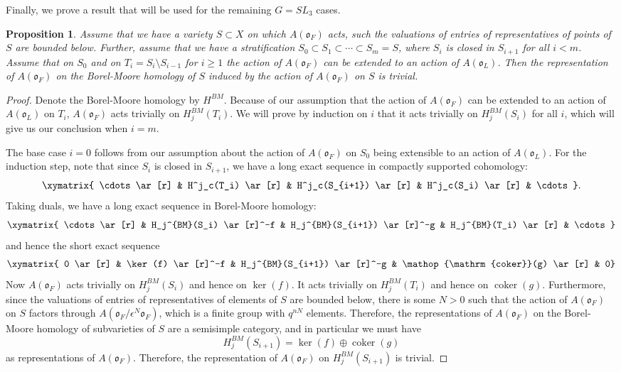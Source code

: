 \documentclass{amsart}
\newtheorem{prop}{Proposition}[subsection]
\theoremstyle{definition}
\def\O{\mathfrak{o}}
\def\e{\epsilon}
\def\coker{\mathop{\mathrm{coker}}}
\def\A{A(\O_F)}
\begin{document}
  Finally, we prove a result that will be used for the remaining $G = SL_3$
  cases.
  \begin{prop}
    \label{prop:Triviality-For-Stratified-Set}
    Assume that we have a variety $S \subset X$ on which $\A$ acts, such the
    valuations of entries of representatives of points of $S$ are bounded
    below.  Further, assume that we have a stratification $S_0 \subset S_1
    \subset \cdots \subset S_m = S$, where $S_i$ is closed in $S_{i + 1}$ for
    all $i < m$.  Assume that on $S_0$ and on $T_i = S_i \setminus S_{i - 1}$
    for $i \ge 1$ the action of $\A$ can be extended to an action of $A(\O_L)$.
    Then the representation of $\A$ on the Borel-Moore homology of $S$ induced
    by the action of $\A$ on $S$ is trivial.
  \end{prop}
  \begin{proof}
    Denote the Borel-Moore homology by $H^{BM}$.  Because of our assumption
    that the action of $\A$ can be extended to an action of $A(\O_L)$ on $T_i$,
    $\A$ acts trivially on $H_j^{BM}(T_i)$.  We will prove by induction on $i$
    that it acts trivially on $H_j^{BM}(S_i)$ for all $i$, which will give us
    our conclusion when $i = m$.

    The base case $i = 0$ follows from our assumption about the action of $\A$
    on $S_0$ being extensible to an action of $A(\O_L)$.  For the induction
    step, note that since $S_i$ is closed in $S_{i + 1}$, we have a long exact
    sequence in compactly supported cohomology:
    \begin{equation*}
      \xymatrix{
	\cdots \ar[r] &
	H^j_c(T_i) \ar[r] &
	H^j_c(S_{i+1}) \ar[r] &
	H^j_c(S_i) \ar[r] &
	\cdots}.
    \end{equation*}
    Taking duals, we have a long exact sequence in Borel-Moore homology:
    \begin{equation*}
     \xymatrix{
       \cdots \ar[r] &
       H_j^{BM}(S_i) \ar[r]^-f &
       H_j^{BM}(S_{i+1}) \ar[r]^-g &
       H_j^{BM}(T_i) \ar[r] &
       \cdots}
    \end{equation*}
    and hence the short exact sequence
    \begin{equation*}
     \xymatrix{
       0 \ar[r] &
       \ker(f) \ar[r]^-f &
       H_j^{BM}(S_{i+1}) \ar[r]^-g &
       \coker(g) \ar[r] &
       0}
    \end{equation*}
    Now $\A$ acts trivially on $H_j^{BM}(S_i)$ and hence on $\ker(f)$.  It acts
    trivially on $H_j^{BM}(T_i)$ and hence on $\coker(g)$.  Furthermore, since
    the valuations of entries of representatives of elements of $S$ are bounded
    below, there is some $N > 0$ such that the action of $\A$ on $S$ factors
    through $A(\O_F/\e^N\O_F)$, which is a finite group with $q^{nN}$ elements.
    Therefore, the representations of $\A$ on the Borel-Moore homology of
    subvarieties of $S$ are a semisimple category, and in particular we must
    have
    \begin{equation*}
      H_j^{BM}(S_{i+1}) = \ker(f) \oplus \coker(g)
    \end{equation*}
    as representations of $\A$.  Therefore, the representation of $\A$ on
    $H_j^{BM}(S_{i+1})$ is trivial.
  \end{proof}
\end{document}

